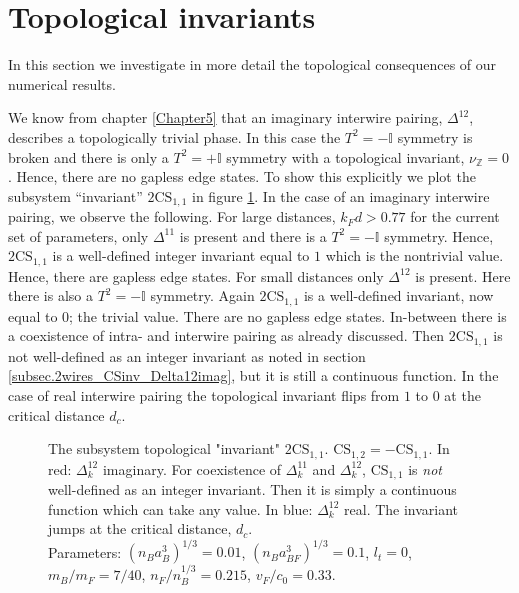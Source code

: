 \section{Topological invariants}
In this section we investigate in more detail the topological consequences of our numerical results. 

We know from chapter \ref{Chapter5} that an imaginary interwire pairing, $\Delta^{12}$, describes a topologically trivial phase. In this case the $T^2 = -\mathbb{I}$ symmetry is broken and there is only a $T^2 = +\mathbb{I}$ symmetry with a topological invariant, $\nu_{\mathbb{Z}} = 0$. Hence, there are no gapless edge states. To show this explicitly we plot the subsystem ``invariant'' $2\text{CS}_{1,1}$ in figure \ref{fig.2wiresCS11ddepend}. In the case of an imaginary interwire pairing, we observe the following. For large distances, $k_Fd > 0.77$ for the current set of parameters, only $\Delta^{11}$ is present and there is a $T^2 = -\mathbb{I}$ symmetry. Hence, $2\text{CS}_{1,1}$ is a well-defined integer invariant equal to $1$ which is the nontrivial value. Hence, there are gapless edge states. For small distances only $\Delta^{12}$ is present. Here there is also a $T^2 = -\mathbb{I}$ symmetry. Again $2\text{CS}_{1,1}$ is a well-defined invariant, now equal to $0$; the trivial value. There are no gapless edge states. In-between there is a coexistence of intra- and interwire pairing as already discussed. Then $2\text{CS}_{1,1}$ is not well-defined as an integer invariant as noted in section \ref{subsec.2wires_CSinv_Delta12imag}, but it is still a continuous function. In the case of real interwire pairing the topological invariant flips from $1$ to $0$ at the critical distance $d_c$. 

\begin{figure}
\begin{center}
  
\caption{The subsystem topological "invariant" $2\text{CS}_{1,1}$. $\text{CS}_{1,2} = - \text{CS}_{1,1}$. In red: $\Delta^{12}_k$ imaginary. For coexistence of $\Delta^{11}_k$ and $\Delta^{12}_k$, $\text{CS}_{1,1}$ is \textit{not} well-defined as an integer invariant. Then it is simply a continuous function which can take any value. In blue: $\Delta^{12}_k$ real. The invariant jumps at the critical distance, $d_c$. \\
Parameters: $(n_Ba_B^3)^{1/3} = 0.01$, $(n_Ba_{BF}^3)^{1/3} = 0.1$, $l_t = 0$, $m_B / m_F = 7/40$, $n_F / n_B^{1/3} = 0.215$, $v_F/c_0 = 0.33$. }  
\label{fig.2wiresCS11ddepend}
\end{center}    
\end{figure} 

